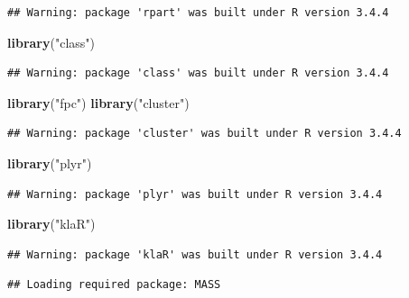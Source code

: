\documentclass[]{article}
\newenvironment{Shaded}{\begin{snugshade}}{\end{snugshade}}
\newcommand{\KeywordTok}[1]{\textcolor[rgb]{0.13,0.29,0.53}{\textbf{#1}}}
\newcommand{\StringTok}[1]{\textcolor[rgb]{0.31,0.60,0.02}{#1}}
\newcommand{\NormalTok}[1]{#1}
\begin{document}
\begin{verbatim}
## Warning: package 'rpart' was built under R version 3.4.4
\end{verbatim}

\begin{Shaded}
\begin{Highlighting}[]
\KeywordTok{library}\NormalTok{(}\StringTok{"class"}\NormalTok{)}
\end{Highlighting}
\end{Shaded}

\begin{verbatim}
## Warning: package 'class' was built under R version 3.4.4
\end{verbatim}

\begin{Shaded}
\begin{Highlighting}[]
\KeywordTok{library}\NormalTok{(}\StringTok{"fpc"}\NormalTok{)}
\KeywordTok{library}\NormalTok{(}\StringTok{"cluster"}\NormalTok{)}
\end{Highlighting}
\end{Shaded}

\begin{verbatim}
## Warning: package 'cluster' was built under R version 3.4.4
\end{verbatim}

\begin{Shaded}
\begin{Highlighting}[]
\KeywordTok{library}\NormalTok{(}\StringTok{"plyr"}\NormalTok{)}
\end{Highlighting}
\end{Shaded}

\begin{verbatim}
## Warning: package 'plyr' was built under R version 3.4.4
\end{verbatim}

\begin{Shaded}
\begin{Highlighting}[]
\KeywordTok{library}\NormalTok{(}\StringTok{"klaR"}\NormalTok{)}
\end{Highlighting}
\end{Shaded}

\begin{verbatim}
## Warning: package 'klaR' was built under R version 3.4.4
\end{verbatim}

\begin{verbatim}
## Loading required package: MASS
\end{verbatim}
\end{document}

